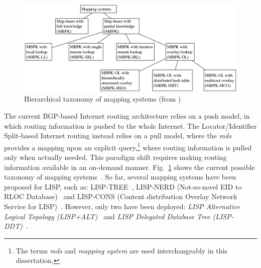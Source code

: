 \begin{figure}[!t]
	\centering
	\includegraphics[width=\textwidth]{Pics/Hierarchical_taxonomy_of_mapping_systems.eps}
	\caption{Hierarchical taxonomy of mapping systems (from \cite{info3-articles-2013-06})}
	\label{Hierarchical_taxonomy_of_mapping_systems}
\end{figure}
The current BGP-based Internet routing architecture relies on a push model, in which routing information is pushed to the whole Internet. The Locator/Identifier Split-based Internet routing instead relies on a pull model, where the \emph{\acrfull{mds}} provides a mapping upon an explicit query,\footnote{The terms \emph{\acrfull{mds}} and \emph{mapping system} are used interchangeably in this dissertation.}  where routing information is pulled only when actually needed. This paradigm shift requires making routing information available in an on-demand manner. %
Fig.~\ref{Hierarchical_taxonomy_of_mapping_systems} shows the current possible taxonomy of mapping systems~\cite{info3-articles-2013-06}. So far, several mapping systems have been proposed for LISP, such as: LISP-TREE~\cite{lispTree}, LISP-NERD (Not-so-novel EID to RLOC Database)~\cite{lear2013nerd} and LISP-CONS (Content distribution Overlay Network Service for LISP)~\cite{brim2008lisp}. However, only two have been deployed: \emph{LISP Alternative Logical Topology (LISP+ALT)}~\cite{rfc6836} and \emph{LISP Delegated Database Tree (LISP-DDT)}~\cite{lispDDT}.


